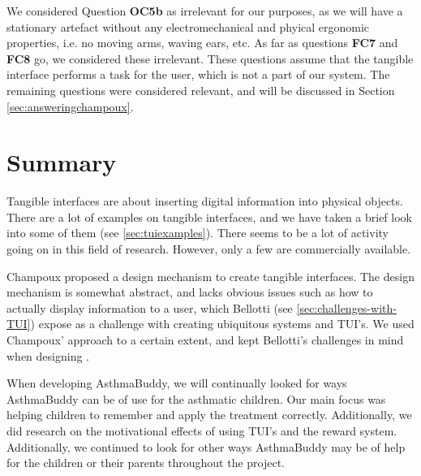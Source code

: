 We considered Question \textbf{OC5b} as irrelevant for our purposes, as we will have a stationary artefact without any electromechanical and phyical ergonomic properties, i.e. no moving arms, waving ears, etc. As far as questions \textbf{FC7} and \textbf{FC8} go, we considered these irrelevant. These questions assume that the tangible interface performs a task for the user, which is not a part of our system. The remaining questions were considered relevant, and will be discussed in Section \ref{sec:answeringchampoux}.     



\section{Summary}
\label{sec:tangiblesummary}
Tangible interfaces are about inserting digital information into physical objects. There are a lot of examples on tangible interfaces, and we have taken a brief look into some of them (see \ref{sec:tuiexamples}). There seems to be a lot of activity going on in this field of research. However, only a few are commercially available. 


Champoux proposed a design mechanism to create tangible interfaces. The design mechanism is somewhat abstract, and lacks obvious issues such as how to actually display information to a user, which Bellotti \etal{} (see \ref{sec:challenges-with-TUI}) expose as a challenge with creating ubiquitous systems and TUI's. We used Champoux' approach to a certain extent, and kept Bellotti's challenges in mind when designing \buddy{}.   

When developing AsthmaBuddy, we will continually looked for ways AsthmaBuddy can be of use for the asthmatic children. Our main focus was helping children to remember and apply the treatment correctly. Additionally, we did research on the motivational effects of using TUI's and the reward system. Additionally, we continued to look for other ways AsthmaBuddy may be of help for the children or their parents throughout the project.  

 